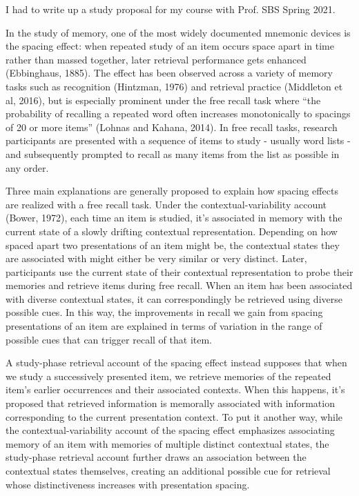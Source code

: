 I had to write up a study proposal for my course with Prof. SBS Spring 2021.

In the study of memory, one of the most widely documented mnemonic devices is the spacing effect: when repeated study of an item occurs space apart in time rather than massed together, later retrieval performance gets enhanced (Ebbinghaus, 1885). The effect has been observed across a variety of memory tasks such as recognition (Hintzman, 1976) and retrieval practice (Middleton et al, 2016), but is especially prominent under the free recall task where “the probability of recalling a repeated word often increases monotonically to spacings of 20 or more items” (Lohnas and Kahana, 2014).  In free recall tasks, research participants are presented with a sequence of items to study - usually word lists - and subsequently prompted to recall as many items from the list as possible in any order. 

Three main explanations are generally proposed to explain how spacing effects are realized with a free recall task. Under the contextual-variability account (Bower, 1972), each time an item is studied, it’s associated in memory with the current state of a slowly drifting contextual representation. Depending on how spaced apart two presentations of an item might be, the contextual states they are associated with might either be very similar or very distinct. Later, participants use the current state of their contextual representation to probe their memories and retrieve items during free recall. When an item has been associated with diverse contextual states, it can correspondingly be retrieved using diverse possible cues. In this way, the improvements in recall we gain from spacing presentations of an item are explained in terms of variation in the range of possible cues that can trigger recall of that item. 

A study-phase retrieval account of the spacing effect instead supposes that when we study a successively presented item, we retrieve memories of the repeated item’s earlier occurrences and their associated contexts. When this happens, it’s proposed that retrieved information is memorally associated with information corresponding to the current presentation context. To put it another way, while the contextual-variability account of the spacing effect emphasizes associating memory of an item with memories of multiple distinct contextual states, the study-phase retrieval account further draws an association between the contextual states themselves, creating an additional possible cue for retrieval whose distinctiveness increases with presentation spacing.

